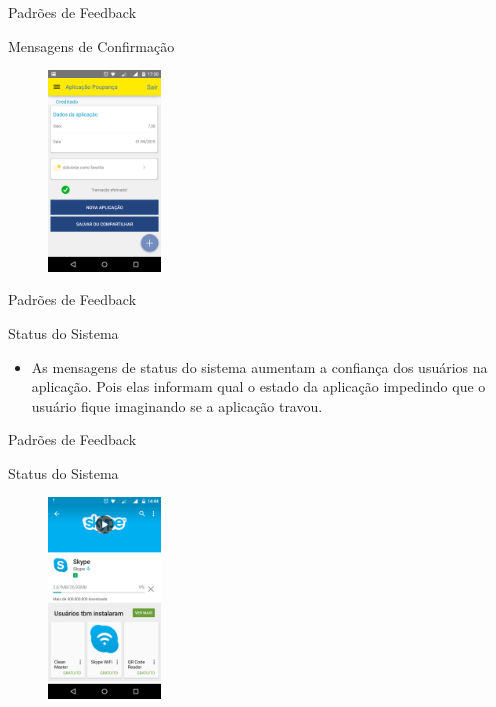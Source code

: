 \begin{frame}{Padrões de Feedback}
\begin{block}{Mensagens de Confirmação}
    \begin{figure}
    \includegraphics[width=3cm]{figuras/confirm/confirm3}
    \end{figure}
\end{block}
\end{frame}

\begin{frame}{Padrões de Feedback}
\begin{block}{Status do Sistema}
  \begin{itemize}
    \item<1-> As mensagens de status do sistema aumentam a confiança dos usuários na aplicação. Pois elas informam qual o estado da aplicação impedindo que o usuário fique imaginando se a aplicação travou.
  \end{itemize}
\end{block}
\end{frame}

\begin{frame}{Padrões de Feedback}
\begin{block}{Status do Sistema}
    \begin{figure}
    \includegraphics[width=3cm]{figuras/status/status}
    \end{figure}
\end{block}
\end{frame}

